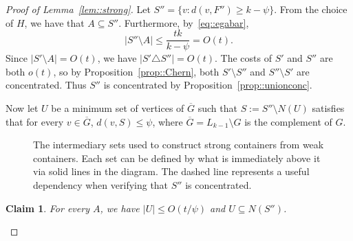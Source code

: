 \documentclass[12pt]{article}
\renewcommand{\bar}[1]{\overline{#1}}
\newtheorem{claim}[theorem]{Claim}
\begin{document}
\begin{proof}[Proof of Lemma~\ref{lem::strong}]
Let $S'' = \{v : d(v,F'') \geq k-\psi\}$. From the choice of $H$, we have that $A \subseteq S''$. Furthermore, by~\eqref{eq::egabar},
\begin{equation}\label{eq::S''-A}
|S'' \setminus A| \leq \frac{tk}{k-\psi} = O(t) .
\end{equation}
Since $|S' \setminus A| = O(t)$, we have $|S' \triangle S''| = O(t)$. The costs of $S'$ and $S''$ are both $o(t)$, so by Proposition~\ref{prop::Chern}, both $S' \setminus S''$ and $S'' \setminus S'$ are concentrated. Thus $S''$ is concentrated by Proposition~\ref{prop::unionconc}.

Now let $U$ be a minimum set of vertices of $\bar{G}$ such that $S := S'' \setminus N(U)$ satisfies that for every $v \in \bar{G}$, $d(v,S) \leq \psi$, where $\bar{G} = L_{k-1} \setminus G$ is the complement of $G$.

\begin{figure}[ht]
\centering
{}
\caption{The intermediary sets used to construct strong containers from weak containers. Each set can be defined by what is immediately above it via solid lines in the diagram. The dashed line represents a useful dependency when verifying that $S''$ is concentrated.}
\label{fig::strong}
\end{figure}

\begin{claim}\label{claim::U}
For every $A$, we have $|U| \leq O(t/\psi)$ and $U \subseteq N(S'')$.
\end{claim}


\end{proof}
\end{document}
